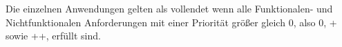Die einzelnen Anwendungen gelten als vollendet wenn alle Funktionalen- und Nichtfunktionalen Anforderungen mit einer Priorität größer gleich \glqq{}0\grqq{}, also \glqq{}0\grqq{}, \glqq{}+\grqq{} sowie \glqq{}++\grqq{}, erfüllt sind.
